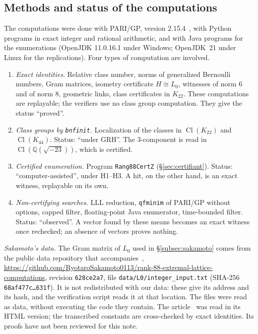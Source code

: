 \documentclass[11pt,a4paper]{amsart}
\theoremstyle{plain}
\theoremstyle{definition}
\numberwithin{equation}{section}
\newcommand{\Q}{\mathbb{Q}}
\DeclareMathOperator{\Cl}{Cl}
\newcommand{\Lz}{L_{0}}
\begin{document}
\subsection{Methods and status of the computations}\label{subsec:methodes}
The computations were done with PARI/GP, version 2.15.4~\cite{PARI}, with Python programs in exact integer and rational arithmetic, and with Java programs for the enumerations (OpenJDK 11.0.16.1 under Windows; OpenJDK~21 under Linux for the replications). Four types of computation are involved.
\begin{enumerate}[label=\textup{(C\arabic*)}]
\item \emph{Exact identities.} Relative class number, norms of generalized Bernoulli numbers, Gram matrices, isometry certificate $H\cong\Lz$, witnesses of norm $6$ and of norm $8$, geometric links, class certificates in $K_{22}$. These computations are replayable; the verifiers use no class group computation. They give the status ``proved''.
\item \emph{Class groups by \texttt{bnfinit}.} Localization of the classes in $\Cl(K_{22})$ and $\Cl(K_{44})$. Status: ``under GRH''. The $3$-component is read in $\Cl(\Q(\sqrt{-23}))$, which is certified.
\item \emph{Certified enumeration.} Program \texttt{Rang88CertZ} (\S\ref{sec:certifiant}). Status: ``computer-assisted'', under H1--H3. A hit, on the other hand, is an exact witness, replayable on its own.
\item \emph{Non-certifying searches.} LLL reduction, \texttt{qfminim} of PARI/GP without options, capped filter, floating-point Java enumerator, time-bounded filter. Status: ``observed''. A vector found by these means becomes an exact witness once rechecked; an absence of vectors proves nothing.
\end{enumerate}

\emph{Sakamoto's data.} The Gram matrix of $\Lz$ used in \S\ref{subsec:sakamoto} comes from the public data repository that accompanies~\cite{Sak26}, \url{https://github.com/RyotaroSakamoto0113/rank-88-extremal-lattice-computations}, revision \texttt{628ce2a7}, file \texttt{data/L0/integer\_input.txt} (SHA-256 \texttt{68af477c\dots631f}). It is not redistributed with our data: these give its address and its hash, and the verification script reads it at that location. The files were read as data, without executing the code they contain. The article~\cite{Sak26} was read in its HTML version; the transcribed constants are cross-checked by exact identities. Its proofs have not been reviewed for this note.
\end{document}
